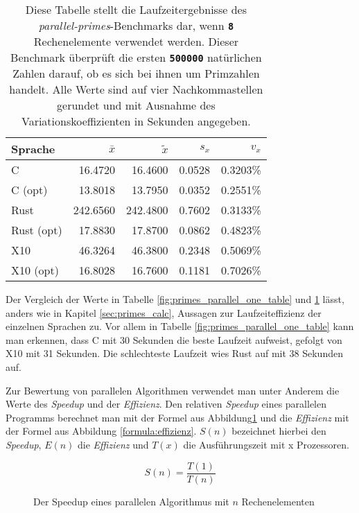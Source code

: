 \begin{table}
	\begin{center}
		\begin{tabular}{lrrrr}
			\toprule
			Sprache & $\bar{x}$ & $\tilde{x}$ & $s_x$ & $v_x$ \\
			\midrule
			C          &  16.4720 &  16.4600 & 0.0528 & 0.3203\% \\
			C (opt)    &  13.8018 &  13.7950 & 0.0352 & 0.2551\% \\
			Rust       & 242.6560 & 242.4800 & 0.7602 & 0.3133\% \\
			Rust (opt) &  17.8830 &  17.8700 & 0.0862 & 0.4823\% \\
			X10        &  46.3264 &  46.3800 & 0.2348 & 0.5069\% \\
			X10 (opt)  &  16.8028 &  16.7600 & 0.1181 & 0.7026\% \\
			\bottomrule
		\end{tabular}
	\end{center}
	\caption{
		Diese Tabelle stellt die Laufzeitergebnisse des \textit{parallel-primes}-Benchmarks dar,
		wenn \texttt{\textsc{\textbf{8}}} Rechenelemente verwendet werden.
		Dieser Benchmark überprüft die ersten \texttt{\textsc{\textbf{500000}}} natürlichen Zahlen darauf,
		ob es sich bei ihnen um Primzahlen handelt.
		Alle Werte sind auf vier Nachkommastellen gerundet und mit Ausnahme des Variationskoeffizienten
		in Sekunden angegeben.
	}
	\label{fig:primes_parallel_eight_table}
\end{table}

Der Vergleich der Werte in Tabelle \ref{fig:primes_parallel_one_table} und \ref{fig:primes_parallel_eight_table} 
lässt, anders wie in Kapitel \ref{sec:primes_calc}, Aussagen zur Laufzeiteffizienz der einzelnen Sprachen zu.
Vor allem in Tabelle \ref{fig:primes_parallel_one_table} kann man erkennen, dass C mit 30 Sekunden die beste Laufzeit aufweist,
gefolgt von X10 mit 31 Sekunden. Die schlechteste Laufzeit wies Rust auf mit 38 Sekunden auf.

Zur Bewertung von parallelen Algorithmen verwendet man unter Anderem die Werte des \textit{Speedup}
und der \textit{Effizienz}.
Den relativen \textit{Speedup} eines parallelen Programms berechnet man mit der Formel aus Abbildung\ref{formula:speedup} und die
\textit{Effizienz} mit der Formel aus Abbildung \ref{formula:effizienz}. $S(n)$ bezeichnet hierbei den \textit{Speedup},
$E(n)$ die \textit{Effizienz} und $T(x)$ die Ausführungszeit mit x Prozessoren.

\begin{figure}
	\caption{Der Speedup eines parallelen Algorithmus mit $n$ Rechenelementen}
	\begin{equation*}
		S(n) = \frac{T(1)}{T(n)}
	\end{equation*}
	\label{formula:speedup}
\end{figure}

